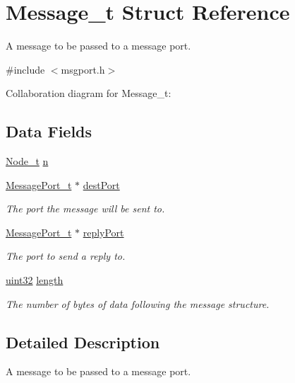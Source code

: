 \hypertarget{structMessage__t}{\section{Message\+\_\+t Struct Reference}
\label{structMessage__t}
}


A message to be passed to a message port.  




{\ttfamily \#include $<$msgport.\+h$>$}



Collaboration diagram for Message\+\_\+t\+:
\subsection*{Data Fields}
\begin{DoxyCompactItemize}
\item 
\hyperlink{structNode__t}{Node\+\_\+t} \hyperlink{structMessage__t_ad39202c787bca02f4dc0dce9f60caead}{n}
\item 
\hyperlink{structMessagePort__t}{Message\+Port\+\_\+t} $\ast$ \hyperlink{structMessage__t_a6cac91bef9fe2098eb00caf47c1afd14}{dest\+Port}
\begin{DoxyCompactList}\small\item\em The port the message will be sent to. \end{DoxyCompactList}\item 
\hyperlink{structMessagePort__t}{Message\+Port\+\_\+t} $\ast$ \hyperlink{structMessage__t_af901b37fc1bb20d21385423fde383058}{reply\+Port}
\begin{DoxyCompactList}\small\item\em The port to send a reply to. \end{DoxyCompactList}\item 
\hyperlink{type_8h_acbd4acd0d29e2d6c43104827f77d9cd2}{uint32} \hyperlink{structMessage__t_a9c626cb2daa6618f78bc294c9e999600}{length}
\begin{DoxyCompactList}\small\item\em The number of bytes of data following the message structure. \end{DoxyCompactList}\end{DoxyCompactItemize}


\subsection{Detailed Description}
A message to be passed to a message port. 

